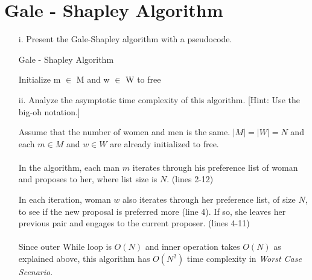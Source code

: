 \documentclass{article}
\begin{document}
    
    
    
    
\section{Gale - Shapley Algorithm}
    \begin{itemize}
        \item[i.] Present the Gale-Shapley algorithm with a pseudocode.
        
        \begin{algorithm}[H]
            
             
            \caption{Gale - Shapley Algorithm}
            Initialize m $\in$  M and w $\in$ W to free \;
        \end{algorithm}
        
        
        \item[ii.] Analyze the asymptotic time complexity of this algorithm. [Hint: Use the big-oh notation.]
        
        \begin{description}
            Assume that the number of women and men is the same.
            $|M| = |W| = N$ and each $m \in M$ and $w \in W$ are already initialized to free. \\ \\
            
            In the algorithm, each man $m$ iterates through his preference list of woman and proposes to her, where list size is $N$. (lines 2-12)
            
            In each iteration, woman $w$ also iterates through her preference list, of size $N$, to see if the new proposal is preferred more (line 4). If so, she leaves her previous pair and engages to the current proposer. (lines 4-11) \\ \\
            
            Since outer While loop is $O(N)$ and inner operation takes $O(N)$ as explained above, this algorithm has $O(N^2)$ time complexity in \emph{Worst Case Scenario}. 
            
            
        \end{description}
        
    \end{itemize}
    
\end{document}
